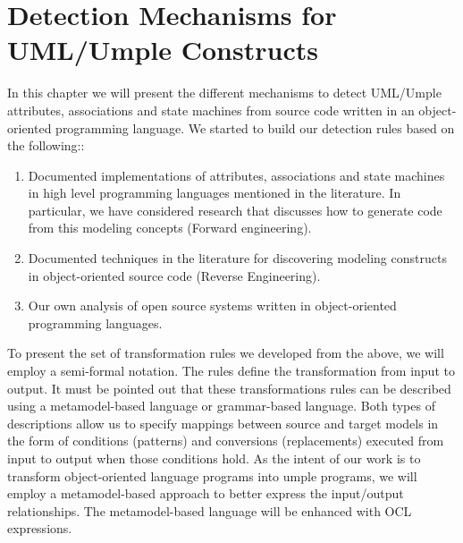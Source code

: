 \lhead{\emph{\leftmark}}  

\chapter{Detection Mechanisms for UML/Umple Constructs}
\label{chap:detections}

In this chapter we will present the different mechanisms to detect UML/Umple attributes, associations and state machines from source code written in an object-oriented programming language. We started to build our detection rules based on the following::

\begin{enumerate}

\item Documented implementations of attributes, associations and state machines in high level programming languages mentioned in the literature. In particular, we have considered research that discusses how to generate code from this modeling concepts (Forward engineering).

\item Documented techniques in the literature for discovering  modeling constructs in object-oriented source code (Reverse Engineering).

\item Our own analysis of open source systems written in object-oriented programming languages.

\end{enumerate}

To present the set of transformation rules we developed from the above, we will employ a semi-formal notation. The rules define the transformation from input to output. It must be pointed out that these transformations rules can be described using a metamodel-based language or grammar-based language. Both types of descriptions allow us to specify mappings between source and target models in the form of conditions (patterns) and conversions (replacements) executed from input to output when those conditions hold. As the intent of our work is to transform object-oriented  language programs into umple programs, we will employ a metamodel-based approach to better express the input/output relationships. The metamodel-based language will be enhanced with OCL \cite{WarmerOCL2003} expressions. 

